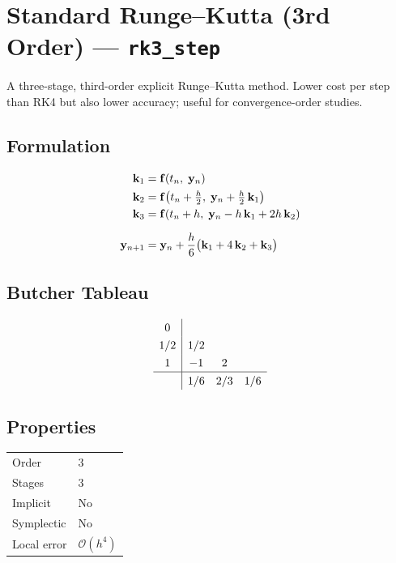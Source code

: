 \documentclass[11pt,a4paper]{article}
\newcommand{\bk}{\mathbf{k}}
\newcommand{\by}{\mathbf{y}}
\newcommand{\bff}{\mathbf{f}}
\newcommand{\bigO}{\mathcal{O}}
\begin{document}
\section{Standard Runge--Kutta (3rd Order) --- \texttt{rk3\_step}}
\label{sec:rk3}

A three-stage, third-order explicit Runge--Kutta method. Lower cost per step
than RK4 but also lower accuracy; useful for convergence-order studies.

\subsection{Formulation}
\begin{align}
  \bk_1 &= \bff(t_n,\;\by_n) \notag\\
  \bk_2 &= \bff\!\left(t_n + \tfrac{h}{2},\;\by_n + \tfrac{h}{2}\,\bk_1\right) \notag\\
  \bk_3 &= \bff\!\left(t_n + h,\;\by_n - h\,\bk_1 + 2h\,\bk_2\right) \notag\\[6pt]
  \by_{n+1} &= \by_n + \frac{h}{6}\bigl(\bk_1 + 4\,\bk_2 + \bk_3\bigr)
  \label{eq:rk3}
\end{align}

\subsection{Butcher Tableau}
\[
\renewcommand{\arraystretch}{1.3}
\begin{array}{c|ccc}
  0   &      &     &     \\
  1/2 & 1/2  &     &     \\
  1   & -1   & 2   &     \\
  \hline
      & 1/6  & 2/3 & 1/6 \\
\end{array}
\]

\subsection{Properties}
\begin{center}
\begin{tabular}{ll}
  \hline
  Order          & 3 \\
  Stages         & 3 \\
  Implicit       & No \\
  Symplectic     & No \\
  Local error    & $\bigO(h^4)$ \\
  \hline
\end{tabular}
\end{center}
\end{document}
